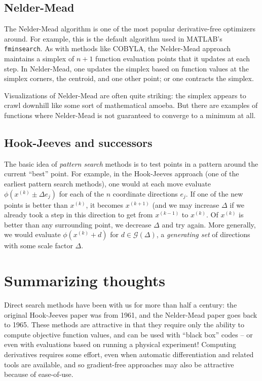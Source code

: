 \documentclass[12pt, leqno]{article} %
\begin{document}
\subsection{Nelder-Mead}

The Nelder-Mead algorithm is one of the most popular derivative-free
optimizers around.  For example, this is the default algorithm used
in MATLAB's {\tt fminsearch}.  As with methods like COBYLA, the
Nelder-Mead approach maintains a simplex of $n+1$ function evaluation
points that it updates at each step.  In Nelder-Mead,
one updates the simplex based on function values at the simplex
corners, the centroid, and one other point; or one contracts the simplex.

Visualizations of Nelder-Mead are often quite striking: the simplex
appears to crawl downhill like some sort of mathematical amoeba.
But there are examples of functions where Nelder-Mead is not
guaranteed to converge to a minimum at all.

\subsection{Hook-Jeeves and successors}

The basic idea of {\em pattern search} methods is to test points in a
pattern around the current ``best'' point.  For example, in the
Hook-Jeeves approach (one of the earliest pattern search methods),
one would at each move evaluate $\phi(x^{(k)} \pm \Delta e_j)$ for each
of the $n$ coordinate directions $e_j$.  If one of the new points is
better than $x^{(k)}$, it becomes $x^{(k+1)}$ (and we may increase
$\Delta$ if we already took a step in this direction to get from
$x^{(k-1)}$ to $x^{(k)}$.  Of $x^{(k)}$ is better than any surrounding
point, we decrease $\Delta$ and try again.  More generally, we would
evaluate $\phi(x^{(k)} + d)$ for $d \in \mathcal{G}(\Delta)$, a
{\em generating set} of directions with some scale factor $\Delta$.

\section{Summarizing thoughts}

Direct search methods have been with us for more than half a century:
the original Hook-Jeeves paper was from 1961, and the Nelder-Mead
paper goes back to 1965.  These methods are attractive in that they
require only the ability to compute objective function values, and can
be used with ``black box'' codes -- or even with evaluations based on
running a physical experiment!  Computing derivatives requires some
effort, even when automatic differentiation and related tools are
available, and so gradient-free approaches may also be attractive
because of ease-of-use.
\end{document}
